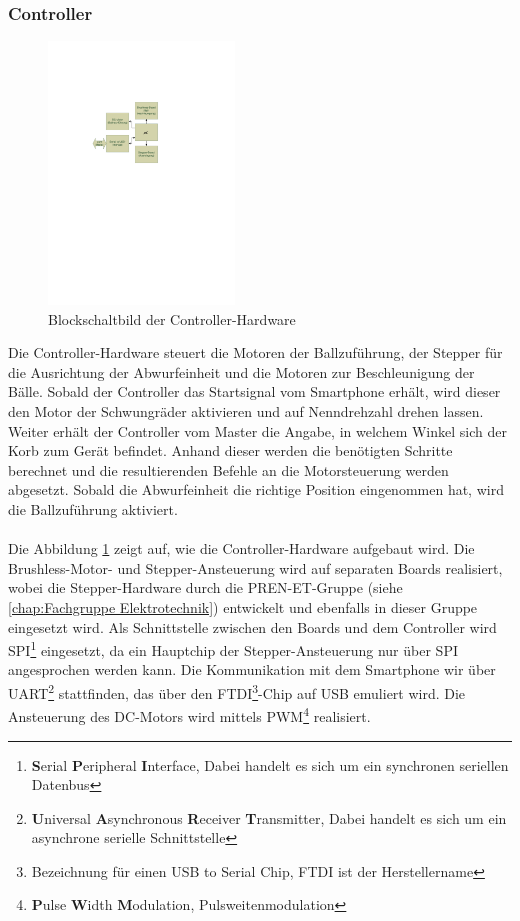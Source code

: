 \subsubsection{Controller}
\label{sec:Controller}
	\begin{figure}
		\centering
		\includegraphics[width=0.44\textwidth,clip,trim= 50mm 16cm 86mm 6.8cm]
			{Enddokumentation/Loesungskonzept/Bilder/Blockschaltbild_Controller.pdf}
		\caption{Blockschaltbild der Controller-Hardware}
		\label{fig:Blockschaltbild_Controller}
	\end{figure}
	Die Controller-Hardware steuert die Motoren der Ballzuführung, der Stepper für die 
	Ausrichtung der Abwurfeinheit und die Motoren zur Beschleunigung der Bälle. Sobald 
	der Controller das Startsignal vom Smartphone erhält, wird dieser den Motor der 
	Schwungräder aktivieren und auf Nenndrehzahl drehen lassen. Weiter erhält der 
	Controller vom Master die Angabe, in welchem Winkel sich der Korb zum Gerät befindet. 
	Anhand dieser werden die benötigten Schritte berechnet und die resultierenden Befehle 
	an die Motorsteuerung werden abgesetzt. Sobald die Abwurfeinheit die richtige Position 
	eingenommen hat, wird die Ballzuführung aktiviert.\\
	\\	
	Die Abbildung \ref{fig:Blockschaltbild_Controller} zeigt auf, wie die Controller-Hardware 
	aufgebaut wird. Die Brushless-Motor- und Stepper-Ansteuerung wird auf separaten Boards 
	realisiert, wobei die Stepper-Hardware durch die PREN-ET-Gruppe (siehe 
	\ref{chap:Fachgruppe Elektrotechnik}) entwickelt und ebenfalls in dieser Gruppe eingesetzt 
	wird. Als Schnittstelle zwischen den Boards und dem Controller wird SPI\footnote{\textbf{S}erial 
	\textbf{P}eripheral \textbf{I}nterface, Dabei handelt es sich um ein synchronen seriellen 
	Datenbus} eingesetzt, da ein Hauptchip der Stepper-Ansteuerung nur über SPI angesprochen 
	werden kann. Die Kommunikation mit dem Smartphone wir über UART\footnote{\textbf{U}niversal 
	\textbf{A}synchronous \textbf{R}eceiver \textbf{T}ransmitter, Dabei handelt es sich um 
	ein asynchrone serielle Schnittstelle} stattfinden, das über den FTDI\footnote{Bezeichnung 
	für einen USB to Serial Chip, FTDI ist der Herstellername}-Chip auf USB emuliert wird. 
	Die Ansteuerung des DC-Motors wird mittels PWM\footnote{\textbf{P}ulse \textbf{W}idth 
	\textbf{M}odulation, Pulsweitenmodulation} realisiert.